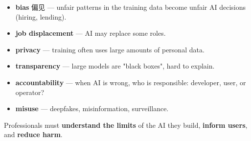 \documentclass[11pt]{article}
\begin{document}
\begin{itemize}
\item \textbf{bias} 偏见 — unfair patterns in the training data become unfair AI decisions (hiring, lending).

\item \textbf{job displacement} — AI may replace some roles.

\item \textbf{privacy} — training often uses large amounts of personal data.

\item \textbf{transparency} — large models are "black boxes", hard to explain.

\item \textbf{accountability} — when AI is wrong, who is responsible: developer, user, or operator?

\item \textbf{misuse} — deepfakes, misinformation, surveillance.

\end{itemize}

Professionals must \textbf{understand the limits} of the AI they build, \textbf{inform users}, and \textbf{reduce harm}.
\end{document}
